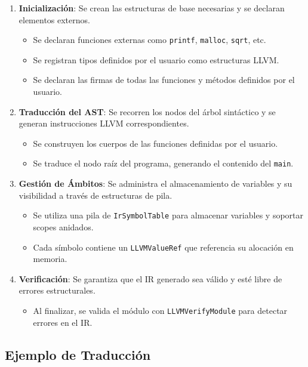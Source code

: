 \documentclass[11pt, a4paper, twoside]{article} %
\begin{document}
\begin{enumerate}
    \item \textbf{Inicialización}: Se crean las estructuras de base necesarias y se declaran elementos externos.
    \begin{itemize}
        \item Se declaran funciones externas como \texttt{printf}, \texttt{malloc}, \texttt{sqrt}, etc.
        \item Se registran tipos definidos por el usuario como estructuras LLVM.
        \item Se declaran las firmas de todas las funciones y métodos definidos por el usuario.
    \end{itemize}
    
    \item \textbf{Traducción del AST}: Se recorren los nodos del árbol sintáctico y se generan instrucciones LLVM correspondientes.
    \begin{itemize}
        \item Se construyen los cuerpos de las funciones definidas por el usuario.
        \item Se traduce el nodo raíz del programa, generando el contenido del \texttt{main}.
    \end{itemize}
    
    \item \textbf{Gestión de Ámbitos}: Se administra el almacenamiento de variables y su visibilidad a través de estructuras de pila.
    \begin{itemize}
        \item Se utiliza una pila de \texttt{IrSymbolTable} para almacenar variables y soportar scopes anidados.
        \item Cada símbolo contiene un \texttt{LLVMValueRef} que referencia su alocación en memoria.
    \end{itemize}
    
    \item \textbf{Verificación}: Se garantiza que el IR generado sea válido y esté libre de errores estructurales.
    \begin{itemize}
        \item Al finalizar, se valida el módulo con \texttt{LLVMVerifyModule} para detectar errores en el IR.
    \end{itemize}
\end{enumerate}

\subsection{Ejemplo de Traducción}
\end{document}
